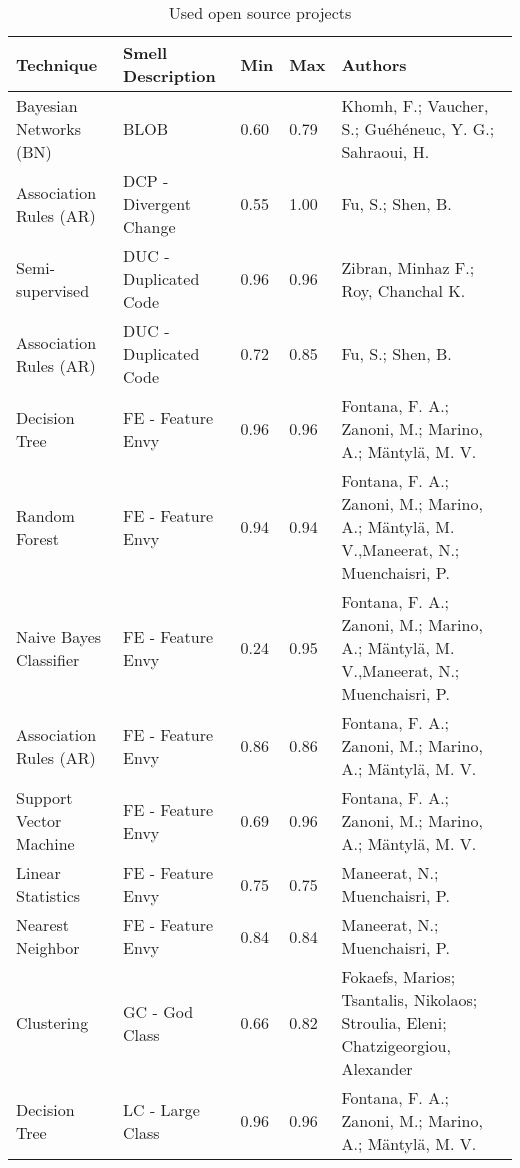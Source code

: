 \begin{small}
\begin{longtable} {|p{}|p{}|l|l|p{}|}
\caption{Used open source projects}
\label{tab:opensourceTable}
\\

\hline
Technique              & Smell Description          & Min   & Max  & Authors \\ \hline
Bayesian Networks (BN) & BLOB                        & 0.60    & 0.79 & Khomh, F.; Vaucher, S.; Guéhéneuc, Y. G.; Sahraoui, H.\\ \hline
Association Rules (AR) & DCP - Divergent Change      & 0.55    & 1.00 & Fu, S.; Shen, B.\\ \hline
Semi-supervised        & DUC - Duplicated Code       & 0.96    & 0.96 & Zibran, Minhaz F.; Roy, Chanchal K.\\ \hline
Association Rules (AR) & DUC - Duplicated Code       & 0.72    & 0.85 & Fu, S.; Shen, B.\\ \hline
Decision Tree          & FE - Feature Envy           & 0.96    & 0.96 & Fontana, F. A.; Zanoni, M.; Marino, A.; Mäntylä, M. V.\\ \hline
Random Forest          & FE - Feature Envy           & 0.94    & 0.94 & Fontana, F. A.; Zanoni, M.; Marino, A.; Mäntylä, M. V.,Maneerat, N.; Muenchaisri, P.\\ \hline
Naive Bayes Classifier & FE - Feature Envy           & 0.24    & 0.95 & Fontana, F. A.; Zanoni, M.; Marino, A.; Mäntylä, M. V.,Maneerat, N.; Muenchaisri, P.\\ \hline
Association Rules (AR) & FE - Feature Envy           & 0.86    & 0.86 & Fontana, F. A.; Zanoni, M.; Marino, A.; Mäntylä, M. V.\\ \hline
Support Vector Machine & FE - Feature Envy           & 0.69    & 0.96 & Fontana, F. A.; Zanoni, M.; Marino, A.; Mäntylä, M. V.\\ \hline
Linear Statistics      & FE - Feature Envy           & 0.75    & 0.75 & Maneerat, N.; Muenchaisri, P.\\ \hline
Nearest Neighbor       & FE - Feature Envy           & 0.84    & 0.84 & Maneerat, N.; Muenchaisri, P.\\ \hline
Clustering             & GC - God Class              & 0.66    & 0.82 & Fokaefs, Marios; Tsantalis, Nikolaos; Stroulia, Eleni; Chatzigeorgiou, Alexander\\ \hline
Decision Tree          & LC - Large Class            & 0.96    & 0.96 & Fontana, F. A.; Zanoni, M.; Marino, A.; Mäntylä, M. V.\\ \hline

\end{longtable}
\end{small}

